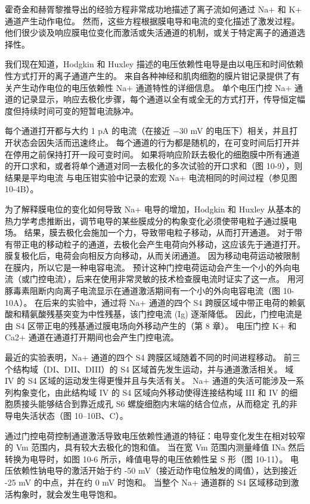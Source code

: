 霍奇金和赫胥黎推导出的经验方程非常成功地描述了离子流如何通过 Na+ 和 K+ 通道产生动作电位。 然而，这些方程根据膜电导和电流的变化描述了激发过程。 他们很少谈及响应膜电位变化而激活或失活通道的机制，或关于特定离子的通道选择性。

我们现在知道，Hodgkin 和 Huxley 描述的电压依赖性电导是由以电压和时间依赖性方式打开的离子通道产生的。 来自各种神经和肌肉细胞的膜片钳记录提供了有关产生动作电位的电压依赖性 Na+ 通道特性的详细信息。 单个电压门控 Na+ 通道的记录显示，响应去极化步骤，每个通道以全有或全无的方式打开，传导恒定幅度但持续时间可变的短暂电流脉冲。

每个通道打开都与大约 1 pA 的电流（在接近 −30 mV 的电压下）相关，并且打开状态会因失活而迅速终止。 每个通道的行为都是随机的，在可变时间后打开并在停用之前保持打开一段可变时间。 如果将响应阶跃去极化的细胞膜中所有通道的开口求和，或者将单个通道对同一去极化的多次试验的开口求和（图 10-9），则结果是平均电流 与电压钳实验中记录的宏观 Na+ 电流相同的时间过程（参见图 10-4B）。

为了解释膜电位的变化如何导致 Na+ 电导的增加，Hodgkin 和 Huxley 从基本的热力学考虑推断出，调节电导的某些膜成分的构象变化必须使带电粒子通过膜电场。 结果，膜去极化会施加一个力，导致带电粒子移动，从而打开通道。 对于带有带正电的移动粒子的通道，去极化会产生电荷向外移动，这应该先于通道打开。 膜复极化后，电荷会向相反方向移动，从而关闭通道。 因为移动电荷运动被限制在膜内，所以它是一种电容电流。 预计这种门控电荷运动会产生一个小的外向电流（或门控电流），后来在使用非常灵敏的技术检查膜电流时证实了这一点。 用河豚毒素阻断内向离子电流显示在通道激活期间有一个小的外向电容电流（图 10-10A）。 在后来的实验中，通过将 Na+ 通道的四个 S4 跨膜区域中带正电荷的赖氨酸和精氨酸残基突变为中性残基，该门控电流 (Ig) 逐渐降低。 因此，门控电流是由 S4 区带正电的残基通过膜电场向外移动产生的（第 8 章）。 电压门控 K+ 和 Ca2+ 通道在通道打开期间也会产生门控电流。

最近的实验表明，Na+ 通道的四个 S4 跨膜区域随着不同的时间进程移动。 前三个结构域（DI、DII、DIII）的 S4 区域首先发生运动，并与通道激活相关。 域 IV 的 S4 区域的运动发生得更慢并且与失活有关。 Na+ 通道的失活可能涉及一系列构象变化，由此结构域 IV 的 S4 区域向外移动使得连接结构域 III 和 IV 的细胞质接头能够结合到靠近成孔 S6 螺旋细胞内末端的结合位点，从而稳定 孔的非导电失活状态（图 10–10B、C）。

通过门控电荷控制通道激活导致电压依赖性通道的特征：电导变化发生在相对较窄的 Vm 范围内，具有较大去极化的饱和值。 当在宽 Vm 范围内测量峰值 INa 然后转换为电导时，如图 10-6 所示，峰值电导的电压依赖性呈 S 形（图 10-11）。 电压依赖性钠电导的激活开始于约 -50 mV（接近动作电位触发的阈值），达到接近 -25 mV 的中点，并在约 0 mV 时饱和。 当整个 Na+ 通道群的 S4 区域移动到激活构象时，就会发生电导饱和。

